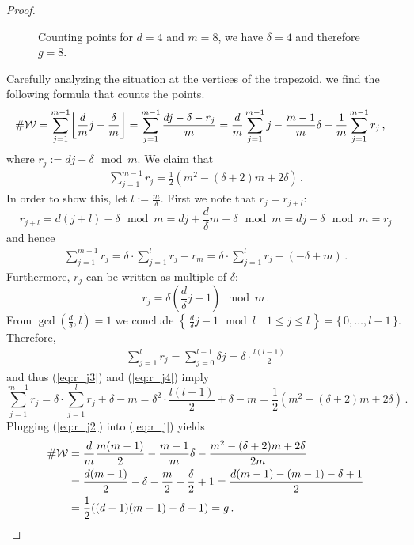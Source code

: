 \documentclass[main.tex]{subfiles}
\begin{document}
\begin{proof}
%      
      \begin{figure}[H]
      \begin{center}
	  
      \end{center}
    \caption{Counting points for $d =4$ and $m = 8$, we have $\delta = 4$ and therefore $g = 8$.} 
    \label{fig:holom_diff}
\end{figure}
     Carefully analyzing the situation at the vertices of the trapezoid, we find the following formula that counts the points.
     \begin{align}\label{eq:r_j}
	\#\W & = \sum_{j = 1}^{m-1} \floor*{\frac{d}{m}j - \frac{\delta}{m}} = \sum_{j = 1}^{m-1} \frac{dj-\delta-r_j}{m} =
	 \frac{d}{m} \sum_{j=1}^{m-1} j - \frac{m-1}{m}\delta - \frac{1}{m} \sum_{j=1}^{m-1} r_j\,,
     \end{align}
      where $r_j := dj - \delta \, \bmod m$. \abstand
      We claim that
      \begin{align}\label{eq:r_j2}
       \sum_{j=1}^{m-1} r_j = \frac{1}{2}(m^2 - (\delta+2)m + 2\delta)\,.
      \end{align}
      In order to show this, let $l := \frac{m}{\delta}$. First we note that $r_j = r_{j+l}$:
      $$r_{j+l} = d(j+l) - \delta \, \bmod m = dj + \frac{d}{\delta}m - \delta \, \bmod m =  dj - \delta \, \bmod m =  r_j$$
      and hence 
      \begin{align}\label{eq:r_j3}
       \sum_{j=1}^{m-1} r_j = \delta \cdot \sum_{j=1}^{l} r_j - r_m = \delta \cdot \sum_{j=1}^{l} r_j - (-\delta + m)\,.
      \end{align}
      Furthermore, $r_j$ can be written as multiple of $\delta$:
      $$r_j = \delta \left(\frac{d}{\delta}j - 1\right) \, \bmod m\,.$$
      From $\gcd(\frac{d}{\delta},l) = 1$ we conclude $\left\{ \, \frac{d}{\delta}j - 1 \, \bmod l  \mid \, 1 \le j \le l \, \right\} = \{ \, 0,\dots,l-1 \, \}$.
      Therefore,  
      \begin{align}\label{eq:r_j4}
       \sum_{j = 1}^l r_j = \sum_{j = 0}^{l-1} \delta j = \delta \cdot \frac{l(l-1)}{2}
      \end{align}
      and thus (\ref{eq:r_j3}) and (\ref{eq:r_j4}) imply
      $$\sum_{j=1}^{m-1} r_j = \delta \cdot \sum_{j=1}^{l} r_j + \delta - m = \delta^2 \cdot \frac{l(l-1)}{2} + \delta - m = \frac{1}{2}(m^2 - (\delta+2)m + 2\delta)\,.$$
      Plugging (\ref{eq:r_j2}) into (\ref{eq:r_j}) yields
      \begin{align*}
	\#\mathcal{W} & = \frac{d}{m}\frac{m(m-1)}{2} - \frac{m-1}{m}\delta - \frac{m^2 - (\delta+2)m + 2\delta}{2m} \\
	       & = \frac{d(m-1)}{2} - \delta  - \frac{m}{2} + \frac{\delta}{2} + 1 =  \frac{d(m-1) - (m-1) - \delta + 1}{2} \\
	       & = \frac{1}{2}((d-1)(m-1)-\delta+1) = g\,.
      \end{align*}
     \end{proof}
\end{document}
